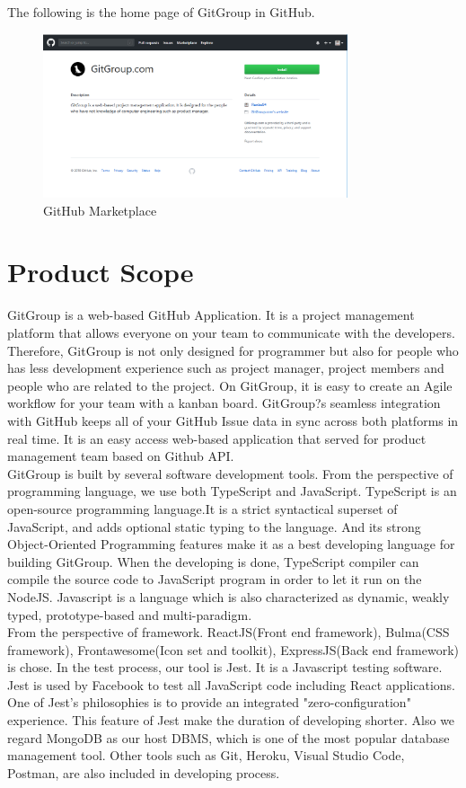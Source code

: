 \documentclass[12pt,a4paper]{report}
\begin{document}
The following is the home page of GitGroup in GitHub.
\begin{figure}[H]
	\centering
	\includegraphics[width=0.8\textwidth]{./pics/gitgrouphomepage.png}
	\caption{GitHub Marketplace}
\end{figure}
\section{Product Scope}
GitGroup is a web-based GitHub Application. It is a project management platform that allows everyone on your team to communicate with the developers. Therefore, GitGroup is not only designed for programmer but also for people who has less development experience such as project manager, project members and people who are related to the project. On GitGroup, it is easy to create an Agile workflow for your team with a kanban board. GitGroup?s seamless integration with GitHub keeps all of your GitHub Issue data in sync across both platforms in real time.
It is an easy access web-based application that served for product management team based on Github API.\\
GitGroup is built by several software development tools. From the perspective of programming language, we use both TypeScript and JavaScript. TypeScript is an open-source programming language.It is a strict syntactical superset of JavaScript, and adds optional static typing to the language. And its strong Object-Oriented Programming features make it as a best developing language for building GitGroup. When the developing is done, TypeScript compiler can compile the source code to JavaScript program in order to let it run on the NodeJS. Javascript is a language which is also characterized as dynamic, weakly typed, prototype-based and multi-paradigm.\\
From the perspective of framework. ReactJS(Front end framework), Bulma(CSS framework), Frontawesome(Icon set and toolkit), ExpressJS(Back end framework) is chose. In the test process, our tool is Jest. It is a Javascript testing software. Jest is used by Facebook to test all JavaScript code including React applications. One of Jest's philosophies is to provide an integrated "zero-configuration" experience. This feature of Jest make the duration of developing shorter. Also we regard MongoDB as our host DBMS, which is one of the most popular database management tool. Other tools such as Git, Heroku, Visual Studio Code, Postman, are also included in developing process.\\
\end{document}
